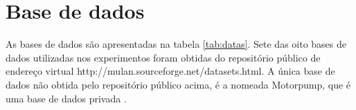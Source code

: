 \section{Base de dados}
\label{sec:datas}
As bases de dados são apresentadas na tabela \ref{tab:datas}.
Sete das oito bases de dados utilizadas nos experimentos foram obtidas do repositório público
de endereço virtual http://mulan.sourceforge.net/datasets.html.
A única base de dados não obtida pelo repositório público acima, é a nomeada Motorpump, que é uma
base de dados privada \cite{mendel2008}.



% 
% 
% 
% 
% 
% 
% 
% 
% 
% 

